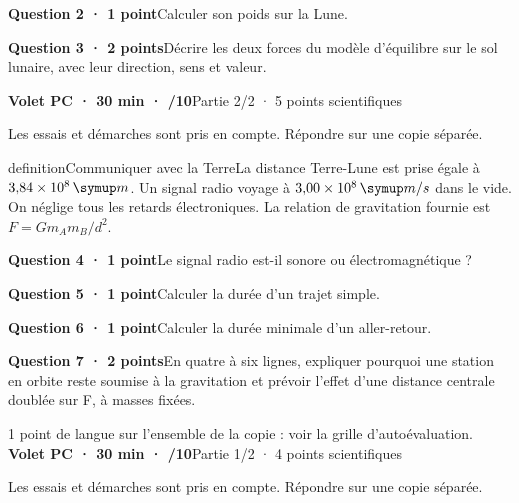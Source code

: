 \par\addvspace{3mm}\noindent\textbf{Question 2 · 1 point}\quad Calculer son poids sur la Lune.\par
\par\addvspace{3mm}\noindent\textbf{Question 3 · 2 points}\quad Décrire les deux forces du modèle d’équilibre sur le sol lunaire, avec leur direction, sens et valeur.\par
\vfill{}
\noindent\textbf{Volet PC · 30 min · /10}\hfill Partie 2/2 · 5 points scientifiques
\par\vspace{2mm}Les essais et démarches sont pris en compte. Répondre sur une copie séparée.\par
\begin{pcEncadre}{definition}{Communiquer avec la Terre}La distance Terre-Lune est prise égale à $3{,}84\times10^8\unite m$. Un signal radio voyage à $3{,}00\times10^8\unite{m/s}$ dans le vide. On néglige tous les retards électroniques. La relation de gravitation fournie est $F=Gm_A m_B/d^2$.\end{pcEncadre}
\par\addvspace{3mm}\noindent\textbf{Question 4 · 1 point}\quad Le signal radio est-il sonore ou électromagnétique ?\par
\par\addvspace{3mm}\noindent\textbf{Question 5 · 1 point}\quad Calculer la durée d’un trajet simple.\par
\par\addvspace{3mm}\noindent\textbf{Question 6 · 1 point}\quad Calculer la durée minimale d’un aller-retour.\par
\par\addvspace{3mm}\noindent\textbf{Question 7 · 2 points}\quad En quatre à six lignes, expliquer pourquoi une station en orbite reste soumise à la gravitation et prévoir l’effet d’une distance centrale doublée sur F, à masses fixées.\par
\vfill{}
{\small 1 point de langue sur l’ensemble de la copie : voir la grille d’autoévaluation.}
\label{bb-5}
\noindent\textbf{Volet PC · 30 min · /10}\hfill Partie 1/2 · 4 points scientifiques
\par\vspace{2mm}Les essais et démarches sont pris en compte. Répondre sur une copie séparée.\par
